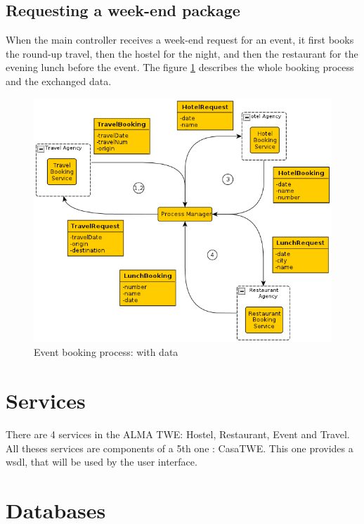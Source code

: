 \documentclass[a4paper]{article}
\begin{document}
			
			
		\subsection{Requesting a week-end package}
		
			When the main controller receives a week-end request for an event, it first books the round-up travel, then the hostel for the night, and then the restaurant for the evening lunch before the event. The figure \ref{fig:bookingprocess} describes the whole booking process and the exchanged data.
			
			\begin{figure}[htp]
				\centering
				\includegraphics[width=\textwidth]{processmanager.png}
				\caption{Event booking process: with data}
				\label{fig:bookingprocess}
			\end{figure}
			
	
	
	\section{Services}
	
		There are 4 services in the ALMA TWE: Hostel, Restaurant, Event and Travel. All theses services are components of a 5th one : CasaTWE. This one provides a wsdl, that will be used by the user interface.
	
	
	\section{Databases}
	
\end{document}
